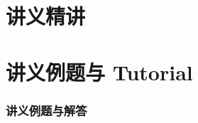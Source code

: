 \documentclass[11pt,a4paper,fontset=fandol]{ctexart}
\begin{document}
\maketitle
\begingroup
\linespread{0.86}\selectfont
\coursenotestoc
\endgroup
\clearpage



\clearpage
\part{讲义精讲}


\clearpage
\part{讲义例题与 Tutorial}
\begin{groupedexercises}
\section{讲义例题与解答}


\end{groupedexercises}
\end{document}
